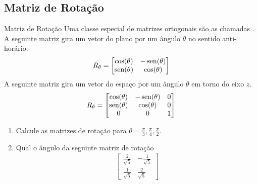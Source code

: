 \subsection*{Matriz de Rotação}
\begin{frame}[label=orto]{Matriz de Rotação}
Uma classe especial de matrizes ortogonais são as chamadas . A seguinte matriz gira um {\color{blue}vetor do plano} por um ângulo $\theta$ no sentido anti-horário.
\[R_\theta= 
\begin{bmatrix}
\cos(\theta) & -\operatorname{sen}(\theta)\\
\operatorname{sen}(\theta) & \cos(\theta)
\end{bmatrix}
\]
A seguinte matriz gira um {\color{blue}vetor do espaço} por um ângulo $\theta$ em torno do eixo \(z\).
\[R_\theta= 
\begin{bmatrix}
\cos(\theta) & -\operatorname{sen}(\theta)& 0\\
\operatorname{sen}(\theta) & \cos(\theta) & 0\\
0 & 0 & 1
\end{bmatrix}
\]
\end{frame}

\begin{frame}[label=orto]
\begin{casa}
\begin{enumerate}
\item Calcule as matrizes de rotação para $\theta=\frac{\pi}{3},\frac{\pi}{4}, \frac{\pi}{2}$.

\item Qual o ângulo da seguinte matriz de rotação
\[
\begin{bmatrix}
\frac{2}{\sqrt{5}} & -\frac{1}{\sqrt{5}} \\[1em] \frac{1}{\sqrt{5}} & \frac{2}{\sqrt{5}}
\end{bmatrix}
\]
\end{enumerate}
\end{casa}

\end{frame}


%
%
%
%

